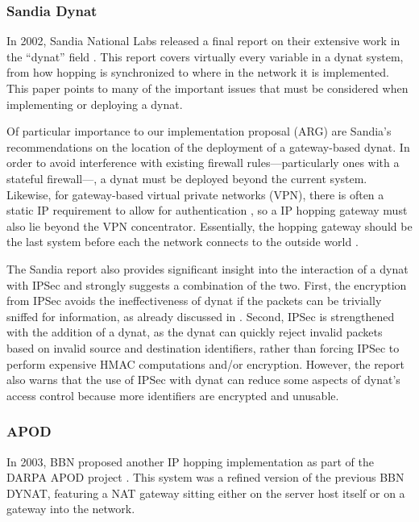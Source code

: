 \subsubsection{Sandia Dynat}
\par In 2002, Sandia National Labs released a final report on their extensive work in the ``dynat'' field \cite{SandiaDynat}. This report covers virtually every variable in a dynat system, from how hopping is synchronized to where in the network it is implemented. This paper points to many of the important issues that must be considered when implementing or deploying a dynat.

\par Of particular importance to our implementation proposal (ARG) are Sandia's recommendations on the location of the deployment of a gateway-based dynat. In order to avoid interference with existing firewall rules---particularly ones with a stateful firewall---, a dynat must be deployed beyond the current system. Likewise, for gateway-based virtual private networks (VPN), there is often a static IP requirement to allow for authentication \cite{SandiaDynat}, so a IP hopping gateway must also lie beyond the VPN concentrator. Essentially, the hopping gateway should be the last system before each the network connects to the outside world \cite{SandiaDynat}.

\par The Sandia report also provides significant insight into the interaction of a dynat with IPSec and strongly suggests a combination of the two. First, the encryption from IPSec avoids the ineffectiveness of dynat if the packets can be trivially sniffed for information, as already discussed in \cite{BBNDYNAT}. Second, IPSec is strengthened with the addition of a dynat, as the dynat can quickly reject invalid packets based on invalid source and destination identifiers, rather than forcing IPSec to perform expensive HMAC computations and/or encryption. However, the report also warns that the use of IPSec with dynat can reduce some aspects of dynat's access control because more identifiers are encrypted and unusable.

\subsubsection{\acf{APOD}}
\par In 2003, BBN proposed another IP hopping implementation as part of the \ac{DARPA} \ac{APOD} project \cite{APOD}. This system was a refined version of the previous BBN DYNAT, featuring a \ac{NAT} gateway sitting either on the server host itself or on a gateway into the network.

